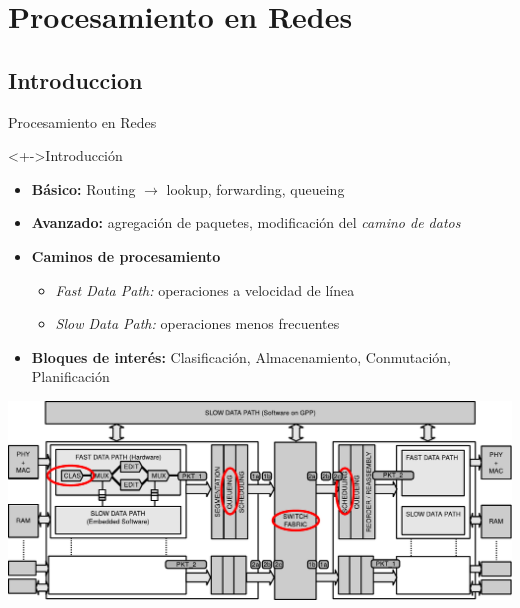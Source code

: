 \documentclass[xcolor=dvipsnames]{beamer}
\begin{document}


\section{Procesamiento en Redes}
\subsection{Introduccion}
\begin{frame}{Procesamiento en Redes}
  \begin{block}<+->{Introducción}
    \begin{itemize}
      \scriptsize
      \item {\bf Básico:} Routing $\rightarrow$ lookup, forwarding, queueing
      \item {\bf Avanzado:} agregación de paquetes, modificación del \emph{camino de datos}
      \item {\bf Caminos de procesamiento}
        \begin{itemize}
        \tiny
          \item \emph{Fast Data Path:} operaciones a velocidad de línea
          \item \emph{Slow Data Path:} operaciones menos frecuentes
        \end{itemize}
      \item {\bf Bloques de interés:} Clasificación, Almacenamiento, Conmutación, Planificación
    \end{itemize}

    \center  
    \includegraphics[scale=0.45]{figures/generic_router}
  \end{block}  
  

\end{frame}
\end{document}
